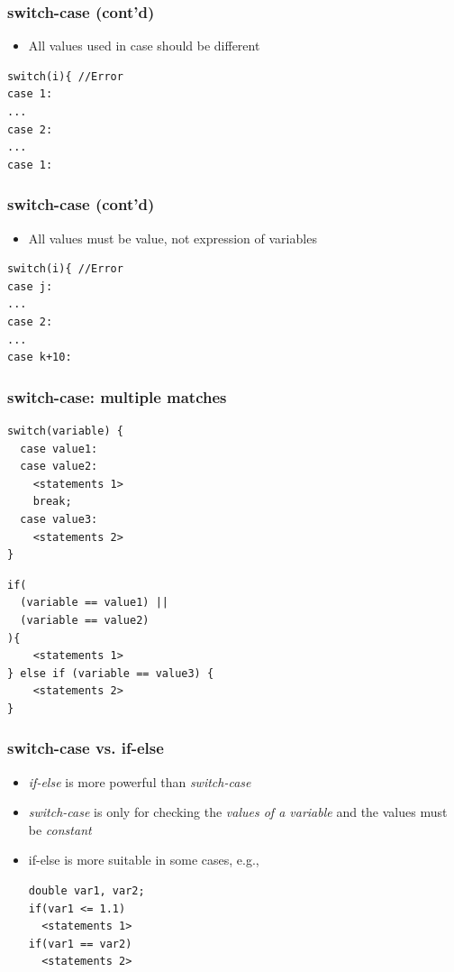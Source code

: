 \documentclass{../c-lecture}
\begin{document}
\begin{frame}[fragile]
  \frametitle{switch-case (cont’d)}
  \begin{itemize}
    \item All values used in case should be different
  \end{itemize}
  \begin{verbatim}
switch(i){ //Error
case 1:
...
case 2:
...
case 1:
  \end{verbatim}
\end{frame}

\begin{frame}[fragile]
  \frametitle{switch-case (cont’d)}
  \begin{itemize}
    \item All values must be value, not expression of variables
  \end{itemize}
  \begin{verbatim}
switch(i){ //Error
case j:
...
case 2:
...
case k+10:
  \end{verbatim}
\end{frame}

\begin{frame}[fragile]
  \frametitle{switch-case: multiple matches}
  \begin{verbatim}
switch(variable) {
  case value1:
  case value2:
    <statements 1>
    break;
  case value3:
    <statements 2>
}
  \end{verbatim}
  \begin{verbatim}
if(
  (variable == value1) ||
  (variable == value2)
){
    <statements 1>
} else if (variable == value3) {
    <statements 2>
}
  \end{verbatim}
\end{frame}

\begin{frame}[fragile]
  \frametitle{switch-case vs. if-else}
  \begin{itemize}
    \item
      \textit{\color{Orange} if-else} is more powerful than
      \textit{\color{Orange} switch-case}

    \item
      \textit{\color{LimeGreen} switch-case} is only for checking the
      \textit{\color{LimeGreen} values of a variable} and the values must be
      \textit{\color{LimeGreen} constant}

    \item if-else is more suitable in some cases, e.g.,
    \begin{verbatim}
double var1, var2;
if(var1 <= 1.1)
  <statements 1>
if(var1 == var2)
  <statements 2>
    \end{verbatim}
  \end{itemize}
\end{frame}
\end{document}

